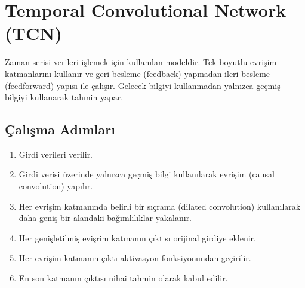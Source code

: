 \section{Temporal Convolutional Network (TCN)}
Zaman serisi verileri işlemek için kullanılan modeldir. Tek boyutlu evrişim katmanlarını kullanır ve geri besleme (feedback) yapmadan ileri besleme (feedforward) yapısı ile çalışır. Gelecek bilgiyi kullanmadan yalnızca geçmiş bilgiyi kullanarak tahmin yapar.

\subsection{Çalışma Adımları}
\begin{enumerate}
	\item Girdi verileri verilir.
	\item Girdi verisi üzerinde yalnızca geçmiş bilgi kullanılarak evrişim (causal convolution) yapılır.
	\item Her evrişim katmanında belirli bir sıçrama (dilated convolution) kullanılarak daha geniş bir alandaki bağımlılıklar yakalanır.
	\item Her genişletilmiş evişrim katmanın çıktısı orijinal girdiye eklenir.
	\item Her evrişim katmanın çıktı aktivasyon fonksiyonundan geçirilir.
	\item En son katmanın çıktısı nihai tahmin olarak kabul edilir.
\end{enumerate}

\newpage